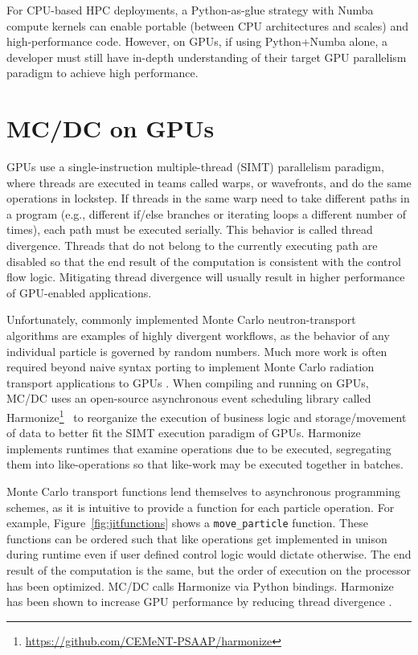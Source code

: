 For CPU-based HPC deployments, a Python-as-glue strategy with Numba compute kernels can enable portable (between CPU architectures and scales) and high-performance code.
However, on GPUs, if using Python+Numba alone, a developer must still have in-depth understanding of their target GPU parallelism paradigm to achieve high performance.

\section{MC/DC on GPUs}

GPUs use a single-instruction multiple-thread (SIMT) parallelism paradigm, where threads are executed in teams called warps, or wavefronts, and do the same operations in lockstep. 
If threads in the same warp need to take different paths in a program (e.g., different if/else branches or iterating loops a different number of times), each path must be executed serially.
This behavior is called thread divergence.
Threads that do not belong to the currently executing path are disabled so that the end result of the computation is consistent with the control flow logic.
Mitigating thread divergence will usually result in higher performance of GPU-enabled applications.

Unfortunately, commonly implemented Monte Carlo neutron-transport algorithms are examples of highly divergent workflows, as the behavior of any individual particle is governed by random numbers.
Much more work is often required beyond naive syntax porting to implement Monte Carlo radiation transport applications to GPUs \cite{pozulp_progress_2023}.
When compiling and running on GPUs, MC/DC uses an open-source asynchronous event scheduling library called Harmonize\footnote{\url{https://github.com/CEMeNT-PSAAP/harmonize}}~\cite{brax2023} to 
reorganize the execution of business logic and storage/movement of data to better fit the SIMT execution paradigm of GPUs.
Harmonize implements runtimes that examine operations due to be executed, segregating them into like-operations so that like-work may be executed together in batches.

Monte Carlo transport functions lend themselves to asynchronous programming schemes, as it is intuitive to provide a function for each particle operation.
For example, Figure~\ref{fig:jitfunctions} shows a \texttt{move\_particle} function.
These functions can be ordered such that like operations get implemented in unison during runtime even if user defined control logic would dictate otherwise.
The end result of the computation is the same, but the order of execution on the processor has been optimized.
MC/DC calls Harmonize via Python bindings.
Harmonize has been shown to increase GPU performance by reducing thread divergence \cite{brax2023}.

